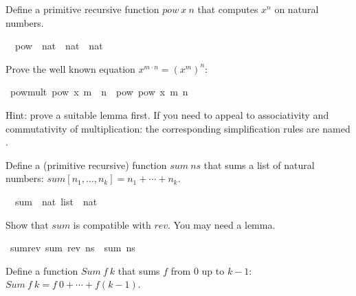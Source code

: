 %
\begin{isabellebody}%
\def\isabellecontext{Arithmetic}%
\isamarkupfalse%
%
\isamarkuptrue%
%
\isamarkuptrue%
%
\begin{isamarkuptext}%
Define a primitive recursive function $pow~x~n$ that
computes $x^n$ on natural numbers.%
\end{isamarkuptext}%
\isamarkuptrue%
\isanewline
\ \ pow\ {\isacharcolon}{\isacharcolon}\ {\isachardoublequote}nat\ {\isacharequal}{\isachargreater}\ nat\ {\isacharequal}{\isachargreater}\ nat{\isachardoublequote}\isamarkupfalse%
%
\begin{isamarkuptext}%
Prove the well known equation $x^{m \cdot n} = (x^m)^n$:%
\end{isamarkuptext}%
\isamarkuptrue%
\ pow{\isacharunderscore}mult{\isacharcolon}\ {\isachardoublequote}pow\ x\ {\isacharparenleft}m\ {\isacharasterisk}\ n{\isacharparenright}\ {\isacharequal}\ pow\ {\isacharparenleft}pow\ x\ m{\isacharparenright}\ n{\isachardoublequote}\isamarkupfalse%
\isamarkupfalse%
%
\begin{isamarkuptext}%
Hint: prove a suitable lemma first.  If you need to appeal to
associativity and commutativity of multiplication: the corresponding
simplification rules are named .%
\end{isamarkuptext}%
\isamarkuptrue%
%
\isamarkuptrue%
%
\begin{isamarkuptext}%
Define a (primitive recursive) function $sum~ns$ that sums a list
of natural numbers: $sum [n_1, \dots, n_k] = n_1 + \cdots + n_k$.%
\end{isamarkuptext}%
\isamarkuptrue%
\isanewline
\ \ sum\ {\isacharcolon}{\isacharcolon}\ {\isachardoublequote}nat\ list\ {\isacharequal}{\isachargreater}\ nat{\isachardoublequote}\isamarkupfalse%
%
\begin{isamarkuptext}%
Show that $sum$ is compatible with $rev$. You may need a lemma.%
\end{isamarkuptext}%
\isamarkuptrue%
\ sum{\isacharunderscore}rev{\isacharcolon}\ {\isachardoublequote}sum\ {\isacharparenleft}rev\ ns{\isacharparenright}\ {\isacharequal}\ sum\ ns{\isachardoublequote}\isamarkupfalse%
\isamarkupfalse%
%
\begin{isamarkuptext}%
Define a function $Sum~f~k$ that sums $f$ from $0$
up to $k-1$: $Sum~f~k = f~0 + \cdots + f(k - 1)$.%
\end{isamarkuptext}%

\end{isabellebody}
